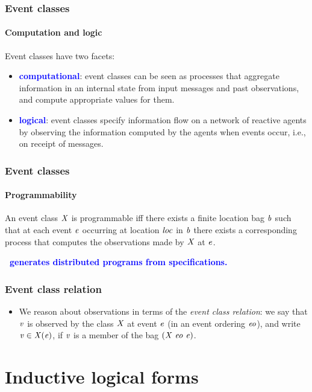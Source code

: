 \documentclass[12pt,red]{beamer}
\newcommand{\cemph}[1]{\textcolor{blue}{\textbf{#1}}}
\begin{document}
\begin{frame}
  \frametitle{Event classes}

  \framesubtitle{Computation and logic}

  Event classes have two facets:
  \begin{itemize}
  \item \cemph{computational}: event classes can be seen as processes
    that aggregate information in an internal state from input
    messages and past observations, and compute appropriate values for
    them.

  \item \cemph{logical}: event classes specify information flow on a
    network of reactive agents by observing the information computed
    by the agents when events occur, i.e., on receipt of messages.
  \end{itemize}
\end{frame}


\begin{frame}
  \frametitle{Event classes}

  \framesubtitle{Programmability}

  An event class $\NUPRL{X}$ is programmable iff there exists a finite
  location bag $\NUPRL{b}$ such that at each event $\NUPRLevent$
  occurring at location $\NUPRL{loc}$ in $\NUPRL{b}$ there exists a
  corresponding process that computes the observations made by
  $\NUPRL{X}$ at $\NUPRLevent$.

  \vspace{0.2in}

  \cemph{\eml\ generates distributed programs from specifications.}
\end{frame}


\begin{frame}
  \frametitle{Event class relation}

  \begin{itemize}
  \item We reason about observations in terms of the \emph{event class
    relation}: we say that $\NUPRL{v}$ is observed by the class
    $\NUPRL{X}$ at event $\NUPRLevent$ (in an event ordering
    $\NUPRLes$), and write
    $\NUPRLclassrel{\NUPRLes}{\NUPRLevent}{\NUPRL{T}}{\NUPRL{X}}{\NUPRL{v}}$,
    if $\NUPRL{v}$ is a member of the bag
    $(\NUPRLappclass{\NUPRL{X}}{\NUPRLes}{\NUPRLevent})$.
  \end{itemize}
\end{frame}


\section{Inductive logical forms}
\end{document}
